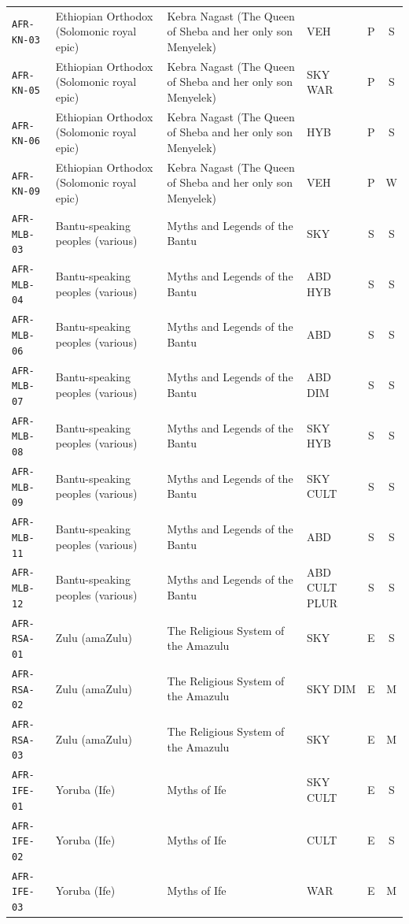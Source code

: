 \documentclass[11pt,a4paper]{article}
\begin{document}
\begin{longtable}{@{}p{1.6cm}p{3.6cm}p{6.9cm}p{2.1cm}cc@{}}
\texttt{AFR-KN-03} & Ethiopian Orthodox (Solomonic royal epic) & Kebra Nagast (The Queen of Sheba and her only son Menyelek) & VEH & P & S \\
\texttt{AFR-KN-05} & Ethiopian Orthodox (Solomonic royal epic) & Kebra Nagast (The Queen of Sheba and her only son Menyelek) & SKY WAR & P & S \\
\texttt{AFR-KN-06} & Ethiopian Orthodox (Solomonic royal epic) & Kebra Nagast (The Queen of Sheba and her only son Menyelek) & HYB & P & S \\
\texttt{AFR-KN-09} & Ethiopian Orthodox (Solomonic royal epic) & Kebra Nagast (The Queen of Sheba and her only son Menyelek) & VEH & P & W \\
\texttt{AFR-MLB-03} & Bantu-speaking peoples (various) & Myths and Legends of the Bantu & SKY & S & S \\
\texttt{AFR-MLB-04} & Bantu-speaking peoples (various) & Myths and Legends of the Bantu & ABD HYB & S & S \\
\texttt{AFR-MLB-06} & Bantu-speaking peoples (various) & Myths and Legends of the Bantu & ABD & S & S \\
\texttt{AFR-MLB-07} & Bantu-speaking peoples (various) & Myths and Legends of the Bantu & ABD DIM & S & S \\
\texttt{AFR-MLB-08} & Bantu-speaking peoples (various) & Myths and Legends of the Bantu & SKY HYB & S & S \\
\texttt{AFR-MLB-09} & Bantu-speaking peoples (various) & Myths and Legends of the Bantu & SKY CULT & S & S \\
\texttt{AFR-MLB-11} & Bantu-speaking peoples (various) & Myths and Legends of the Bantu & ABD & S & S \\
\texttt{AFR-MLB-12} & Bantu-speaking peoples (various) & Myths and Legends of the Bantu & ABD CULT PLUR & S & S \\
\texttt{AFR-RSA-01} & Zulu (amaZulu) & The Religious System of the Amazulu & SKY & E & S \\
\texttt{AFR-RSA-02} & Zulu (amaZulu) & The Religious System of the Amazulu & SKY DIM & E & M \\
\texttt{AFR-RSA-03} & Zulu (amaZulu) & The Religious System of the Amazulu & SKY & E & M \\
\texttt{AFR-IFE-01} & Yoruba (Ife) & Myths of Ife & SKY CULT & E & S \\
\texttt{AFR-IFE-02} & Yoruba (Ife) & Myths of Ife & CULT & E & S \\
\texttt{AFR-IFE-03} & Yoruba (Ife) & Myths of Ife & WAR & E & M \\

\end{longtable}
\end{document}
